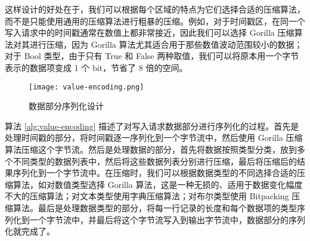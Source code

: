 这样设计的好处在于，我们可以根据每个区域的特点为它们选择合适的压缩算法，而不是只能使用通用的压缩算法进行粗暴的压缩。例如，对于时间戳区，在同一个写入请求中的时间戳通常在数值上都非常接近，因此我们可以选择 Gorilla\cite{pelkonen2015gorilla} 压缩算法对其进行压缩，因为 Gorilla 算法尤其适合用于那些数值波动范围较小的数据；对于 Bool 类型，由于只有 True 和 False 两种取值，我们可以将原本用一个字节表示的数据项变成 1 个 bit，节省了 8 倍的空间。

\begin{figure}
  \centering
  \texttt{[image: value-encoding.png]}
  \caption{数据部分序列化设计}
  \label{fig:value-encoding-general}
\end{figure}

算法 \ref{alg:value-encoding} 描述了对写入请求数据部分进行序列化的过程。首先是处理时间戳的部分，将时间戳逐一序列化到一个字节流中，然后使用 Gorilla 压缩算法压缩这个字节流。然后是处理数据的部分，首先将数据按照类型分类，放到多个不同类型的数据列表中，然后将这些数据列表分别进行压缩，最后将压缩后的结果序列化到一个字节流中。在压缩时，我们可以根据数据类型的不同选择合适的压缩算法，如对数值类型选择 Gorilla 算法，这是一种无损的、适用于数据变化幅度不大的压缩算法；对文本类型使用字典压缩算法；对布尔类型使用 Bitpacking 压缩算法\cite{hwang2023lossless}。最后是处理数据类型的部分，将每一行记录的长度和每个数据项的类型序列化到一个字节流中，并最后将这个字节流写入到输出字节流中，数据部分的序列化就完成了。

